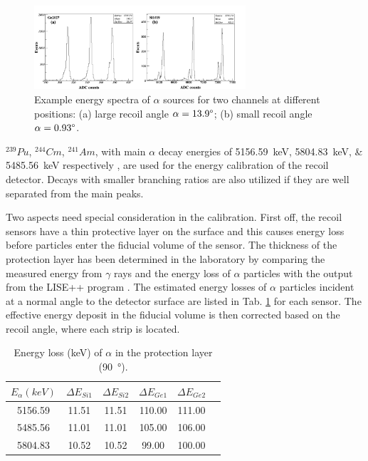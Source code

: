 \documentclass[number,5p]{elsarticle}
\begin{document}
\begin{figure}[ht!]
  \centering
  \includegraphics[width=0.7\textwidth]{./alpha_response.png}
  \caption{Example energy spectra of \(\alpha\) sources for two channels at different positions: (a) large recoil angle $\alpha=13.9\degree$; (b) small recoil angle $\alpha=0.93\degree$.}
  \label{fig:alpha_spectrum}
\end{figure}

\(^{239}Pu\), \(^{244}Cm\), \(^{241}Am\), with main $\alpha$ decay energies
of \SIlist{5156.59;5804.83;5485.56}{\keV} respectively \cite{nuclear_data}, are
used for the energy calibration of the recoil detector.
Decays with smaller branching ratios are also utilized if they are well separated from the main peaks.

Two aspects need special consideration in the calibration.
First off, the recoil sensors have a thin protective layer on the surface and this
causes energy loss before particles enter the fiducial volume of the sensor.
The thickness of the protection layer has been determined in the laboratory by
comparing the measured energy from \(\gamma\) rays \cite{recoil_article} and the
energy loss of $\alpha$ particles with the output from the LISE++ program \cite{LISE}.
The estimated energy losses of $\alpha$ particles incident at a normal angle to
the detector surface are listed in Tab. \ref{tab:dead_layer} for each sensor.
The effective energy deposit in the fiducial volume is then corrected based on the recoil angle, where each strip is located.
\begin{table}[h!]
  \centering
  \caption{Energy loss (\si{\keV}) of $\alpha$ in the protection layer (\SI{90}{\degree}).}
  \label{tab:dead_layer}
  \begin{tabular}{cccccc}
    \hline
    \(E_{\alpha} (keV)\) & \(\Delta E_{Si1}\) & \(\Delta E_{Si2}\) & \(\Delta E_{Ge1}\) & \(\Delta E_{Ge2}\) \\
    \hline
    5156.59 & 11.51 & 11.51 & 110.00 & 111.00 \\
    5485.56 & 11.01 & 11.01 & 105.00 & 106.00 \\
    5804.83 & 10.52 & 10.52 & 99.00  & 100.00 \\
    \hline
  \end{tabular}
\end{table}
\end{document}
